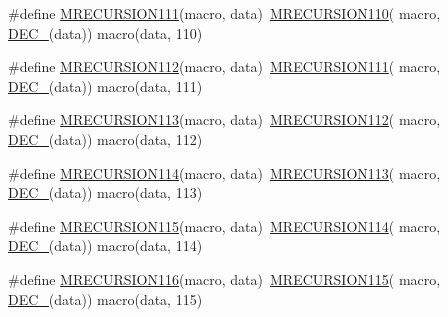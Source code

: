 \begin{DoxyCompactItemize}
\item 
\#define \mbox{\hyperlink{group__group__sam0__utils__mrecursion_ga356438994d8a464952aacd98495045a3}{M\+R\+E\+C\+U\+R\+S\+I\+O\+N111}}(macro,  data)~\mbox{\hyperlink{group__group__sam0__utils__mrecursion_ga6e8affd87de0ca5058d3864a21b71971}{M\+R\+E\+C\+U\+R\+S\+I\+O\+N110}}(  macro, \mbox{\hyperlink{group__group__sam0__utils__mrecursion_ga1d23d683797679dca8c3512a54a5dcae}{D\+E\+C\+\_\+}}(data))   macro(data, 110)
\item 
\#define \mbox{\hyperlink{group__group__sam0__utils__mrecursion_ga37369c217da5a5c8941ba78d34202c40}{M\+R\+E\+C\+U\+R\+S\+I\+O\+N112}}(macro,  data)~\mbox{\hyperlink{group__group__sam0__utils__mrecursion_ga356438994d8a464952aacd98495045a3}{M\+R\+E\+C\+U\+R\+S\+I\+O\+N111}}(  macro, \mbox{\hyperlink{group__group__sam0__utils__mrecursion_ga1d23d683797679dca8c3512a54a5dcae}{D\+E\+C\+\_\+}}(data))   macro(data, 111)
\item 
\#define \mbox{\hyperlink{group__group__sam0__utils__mrecursion_ga4f47c8ada861a739b042e92989a455d6}{M\+R\+E\+C\+U\+R\+S\+I\+O\+N113}}(macro,  data)~\mbox{\hyperlink{group__group__sam0__utils__mrecursion_ga37369c217da5a5c8941ba78d34202c40}{M\+R\+E\+C\+U\+R\+S\+I\+O\+N112}}(  macro, \mbox{\hyperlink{group__group__sam0__utils__mrecursion_ga1d23d683797679dca8c3512a54a5dcae}{D\+E\+C\+\_\+}}(data))   macro(data, 112)
\item 
\#define \mbox{\hyperlink{group__group__sam0__utils__mrecursion_ga642f08b42d8b06e2c23282224fd77a28}{M\+R\+E\+C\+U\+R\+S\+I\+O\+N114}}(macro,  data)~\mbox{\hyperlink{group__group__sam0__utils__mrecursion_ga4f47c8ada861a739b042e92989a455d6}{M\+R\+E\+C\+U\+R\+S\+I\+O\+N113}}(  macro, \mbox{\hyperlink{group__group__sam0__utils__mrecursion_ga1d23d683797679dca8c3512a54a5dcae}{D\+E\+C\+\_\+}}(data))   macro(data, 113)
\item 
\#define \mbox{\hyperlink{group__group__sam0__utils__mrecursion_ga1c977ad5b01e08a40d348d2ea87fedbb}{M\+R\+E\+C\+U\+R\+S\+I\+O\+N115}}(macro,  data)~\mbox{\hyperlink{group__group__sam0__utils__mrecursion_ga642f08b42d8b06e2c23282224fd77a28}{M\+R\+E\+C\+U\+R\+S\+I\+O\+N114}}(  macro, \mbox{\hyperlink{group__group__sam0__utils__mrecursion_ga1d23d683797679dca8c3512a54a5dcae}{D\+E\+C\+\_\+}}(data))   macro(data, 114)
\item 
\#define \mbox{\hyperlink{group__group__sam0__utils__mrecursion_ga32fe65002e3a25cc50fb1344dbada748}{M\+R\+E\+C\+U\+R\+S\+I\+O\+N116}}(macro,  data)~\mbox{\hyperlink{group__group__sam0__utils__mrecursion_ga1c977ad5b01e08a40d348d2ea87fedbb}{M\+R\+E\+C\+U\+R\+S\+I\+O\+N115}}(  macro, \mbox{\hyperlink{group__group__sam0__utils__mrecursion_ga1d23d683797679dca8c3512a54a5dcae}{D\+E\+C\+\_\+}}(data))   macro(data, 115)

\end{DoxyCompactItemize}
